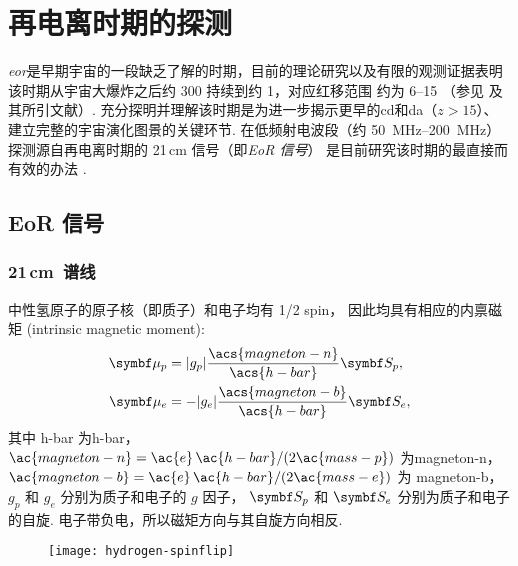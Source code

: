 

\chapter{再电离时期的探测}
\label{chap:detection}


\emph{\acf{eor}}是早期宇宙的一段缺乏了解的时期，目前的理论研究以及有限的观测证据表明
该时期从宇宙大爆炸之后约 \SI{300}{\Myr} 持续到约 \SI{1}{\Gyr}，对应红移范围
约为 \numrange{6}{15} （参见  及其所引文献）.
充分探明并理解该时期是为进一步揭示更早的\ac{cd}和\ac{da}（$z > 15$）、
建立完整的宇宙演化图景的关键环节.
在低频射电波段（约 \SIrange{50}{200}{\MHz}）
探测源自再电离时期的 21\,cm 信号（即\emph{EoR 信号}）
是目前研究该时期的最直接而有效的办法 \cite{madau1997,tozzi2000,furlanetto2006}.


\section{EoR 信号}
\label{sec:eor-signal}

\subsection{21\texorpdfstring{\,}{ }cm~谱线}
\label{sec:21cm-line}

中性氢原子的原子核（即质子）和电子均有 1/2 \ac{spin}，
因此均具有相应的内禀磁矩 (intrinsic magnetic moment):
\begin{align}
  \B{\mu}_p & = |g_p| \frac{\acs{magneton-n}}{\acs{h-bar}} \B{S}_p , \\
  \B{\mu}_e & = - |g_e| \frac{\acs{magneton-b}}{\acs{h-bar}} \B{S}_e ,
\end{align}
其中
\ac{h-bar} 为\acl{h-bar}，
$\ac{magneton-n} = \ac{e}\,\ac{h-bar} / (2 \ac{mass-p})$ 为\acl{magneton-n}，
$\ac{magneton-b} = \ac{e}\,\ac{h-bar} / (2 \ac{mass-e})$ 为 \acl{magneton-b}，
$g_p$ 和 $g_e$ 分别为质子和电子的 $g$ 因子，
$\B{S}_p$ 和 $\B{S}_e$ 分别为质子和电子的自旋.
电子带负电，所以磁矩方向与其自旋方向相反.

\begin{figure}[htp]
  \centering
  \texttt{[image: hydrogen-spinflip]}
  \label{fig:hi-spinflip}
\end{figure}

